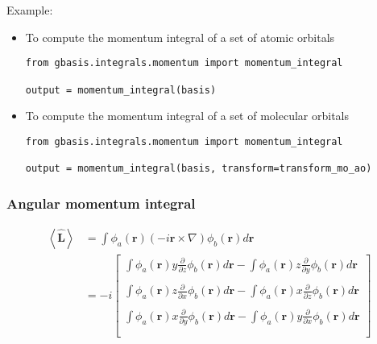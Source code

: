 \documentclass[letterpaper]{article}
\begin{document}
Example:
\begin{itemize}
\item To compute the momentum integral of a set of atomic orbitals
  \begin{lstlisting}[xleftmargin=-25pt]
from gbasis.integrals.momentum import momentum_integral

output = momentum_integral(basis)
\end{lstlisting}
\item To compute the momentum integral of a set of molecular orbitals
  \begin{lstlisting}[xleftmargin=-25pt]
from gbasis.integrals.momentum import momentum_integral

output = momentum_integral(basis, transform=transform_mo_ao)
\end{lstlisting}
\end{itemize}
\subsubsection{Angular momentum integral}
\begin{equation}
  \label{eq:angular_momentum}
  \begin{split}
    \left< \hat{\mathbf{L}} \right>
    &= \int \phi_a(\mathbf{r}) \left( -i \mathbf{r} \times \nabla \right) \phi_b(\mathbf{r}) d\mathbf{r}\\
    &= -i
    \begin{bmatrix}
      \int \phi_a(\mathbf{r}) y\frac{\partial}{\partial z} \phi_b(\mathbf{r}) d\mathbf{r}
      - \int \phi_a(\mathbf{r}) z\frac{\partial}{\partial y} \phi_b(\mathbf{r}) d\mathbf{r}\\\\
      \int \phi_a(\mathbf{r}) z\frac{\partial}{\partial x} \phi_b(\mathbf{r}) d\mathbf{r}
      - \int \phi_a(\mathbf{r}) x\frac{\partial}{\partial z} \phi_b(\mathbf{r}) d\mathbf{r}\\\\
      \int \phi_a(\mathbf{r}) x\frac{\partial}{\partial y} \phi_b(\mathbf{r}) d\mathbf{r}
      - \int \phi_a(\mathbf{r}) y\frac{\partial}{\partial x} \phi_b(\mathbf{r}) d\mathbf{r}\\\\
    \end{bmatrix}
  \end{split}
\end{equation}
\end{document}
